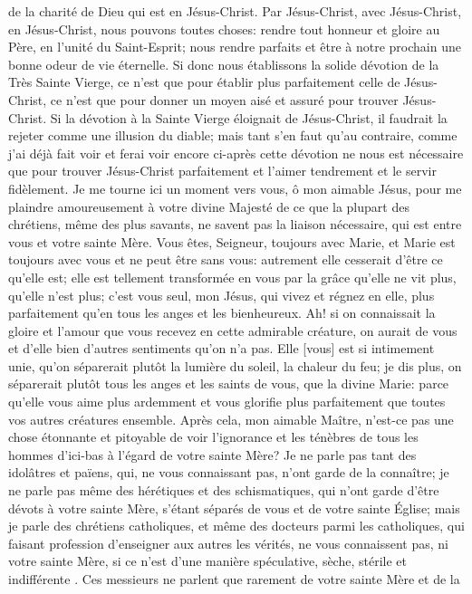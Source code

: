 de la charité de Dieu qui est en Jésus-Christ. Par Jésus-Christ, avec Jésus-Christ, en Jésus-Christ, nous pouvons
toutes choses: rendre tout honneur et gloire au Père, en l'unité du Saint-Esprit; nous rendre parfaits et être à notre
prochain une bonne odeur de vie éternelle.
 Si donc nous établissons la solide dévotion de la Très Sainte Vierge, ce n'est que pour établir plus
parfaitement celle de Jésus-Christ, ce n'est que pour donner un moyen aisé et assuré pour trouver Jésus-Christ. Si
la dévotion à la Sainte Vierge éloignait de Jésus-Christ, il faudrait la rejeter comme une illusion du diable; mais tant
s'en faut qu'au contraire, comme j'ai déjà fait voir et ferai voir encore ci-après cette dévotion ne nous est
nécessaire que pour trouver Jésus-Christ parfaitement et l'aimer tendrement et le servir fidèlement.
 Je me tourne ici un moment vers vous, ô mon aimable Jésus, pour me plaindre amoureusement à votre divine
Majesté de ce que la plupart des chrétiens, même des plus savants, ne savent pas la liaison nécessaire, qui est
entre vous et votre sainte Mère. Vous êtes, Seigneur, toujours avec Marie, et Marie est toujours avec vous et ne
peut être sans vous: autrement elle cesserait d'être ce qu'elle est; elle est tellement transformée en vous par la
grâce qu'elle ne vit plus, qu'elle n'est plus; c'est vous seul, mon Jésus, qui vivez et régnez en elle, plus
parfaitement qu'en tous les anges et les bienheureux. Ah! si on connaissait la gloire et l'amour que vous recevez
en cette admirable créature, on aurait de vous et d'elle bien d'autres sentiments qu'on n'a pas. Elle [vous] est si
intimement unie, qu'on séparerait plutôt la lumière du soleil, la chaleur du feu; je dis plus, on séparerait plutôt tous
les anges et les saints de vous, que la divine Marie: parce qu'elle vous aime plus ardemment et vous glorifie plus
parfaitement que toutes vos autres créatures ensemble.
 Après cela, mon aimable Maître, n'est-ce pas une chose étonnante et pitoyable de voir l'ignorance et les
ténèbres de tous les hommes d'ici-bas à l'égard de votre sainte Mère? Je ne parle pas tant des idolâtres et païens,
qui, ne vous connaissant pas, n'ont garde de la connaître; je ne parle pas même des hérétiques et des
schismatiques, qui n'ont garde d'être dévots à votre sainte Mère, s'étant séparés de vous et de votre sainte Église;
mais je parle des chrétiens catholiques, et même des docteurs parmi les catholiques, qui faisant profession
d'enseigner aux autres les vérités, ne vous connaissent pas, ni votre sainte Mère, si ce n'est d'une manière
spéculative, sèche, stérile et indifférente . Ces messieurs ne parlent que rarement de votre sainte Mère et de la
